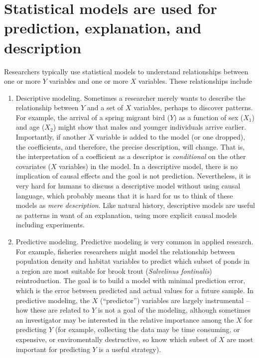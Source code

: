 \documentclass[]{book}
\begin{document}
\hypertarget{statistical-models-are-used-for-prediction-explanation-and-description}{%
\section{Statistical models are used for prediction, explanation, and description}\label{statistical-models-are-used-for-prediction-explanation-and-description}}

Researchers typically use statistical models to understand relationships between one or more \(Y\) variables and one or more \(X\) variables. These relationships include

\begin{enumerate}
\def\labelenumi{\arabic{enumi}.}
\item
  Descriptive modeling. Sometimes a researcher merely wants to describe the relationship between \(Y\) and a set of \(X\) variables, perhaps to discover patterns. For example, the arrival of a spring migrant bird (\(Y\)) as a function of sex (\(X_1\)) and age (\(X_2\)) might show that males and younger individuals arrive earlier. Importantly, if another \(X\) variable is added to the model (or one dropped), the coefficients, and therefore, the precise description, will change. That is, the interpretation of a coefficient as a descriptor is \emph{conditional} on the other covariates (\(X\) variables) in the model. In a descriptive model, there is no implication of causal effects and the goal is not prediction. Nevertheless, it is very hard for humans to discuss a descriptive model without using causal language, which probably means that it is hard for us to think of these models as \emph{mere description}. Like natural history, descriptive models are useful as patterns in want of an explanation, using more explicit causal models including experiments.
\item
  Predictive modeling. Predictive modeling is very common in applied research. For example, fisheries researchers might model the relationship between population density and habitat variables to predict which subset of ponds in a region are most suitable for brook trout (\emph{Salvelinus fontinalis}) reintroduction. The goal is to build a model with minimal prediction error, which is the error between predicted and actual values for a future sample. In predictive modeling, the \(X\) (``predictor'') variables are largely instrumental -- how these are related to \(Y\) is not a goal of the modeling, although sometimes an investigator may be interested in the relative importance among the \(X\) for predicting \(Y\) (for example, collecting the data may be time consuming, or expensive, or enviromentally destructive, so know which subset of \(X\) are most important for predicting \(Y\) is a useful strategy).

\end{enumerate}
\end{document}
